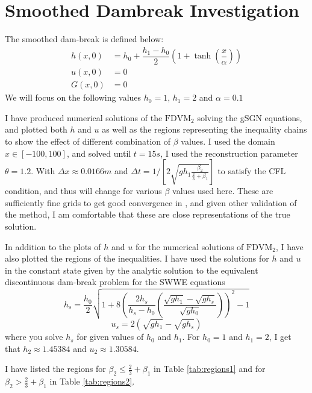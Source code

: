 \documentclass[10pt]{article}
\begin{document}
\section{Smoothed Dambreak Investigation}

The smoothed dam-break is defined below:
\begin{align}
h(x,0) & = h_0 + \dfrac{h_1 - h_0}{2} \left(1 + \tanh\left(\dfrac{x}{\alpha}\right)\right)  \\
u(x,0) &= 0 \\
G(x,0) &= 0
\end{align}
We will focus on the following values $h_0 = 1$, $h_1 = 2$ and $\alpha = 0.1$

I have produced numerical solutions of the $\text{FDVM}_2$ solving the gSGN equations, and plotted both $h$ and $u$ as well as the regions representing the inequality chains to show the effect of different combination of $\beta$ values. I used the domain $x \in [-100, 100]$, and solved until $t = 15s$, I used the reconstruction parameter $\theta = 1.2$. With $\Delta x \approx 0.0166m$ and $\Delta t =  1/ \left[{2\sqrt{gh_1 \frac{\beta_2}{\frac{2}{3} + \beta_1}}} \right]$ to satisfy the CFL condition, and thus will change for various $\beta$ values used here. These are sufficiently fine grids to get good convergence in \cite{Pitt-2019}, and given other validation of the method, I am comfortable that these are close representations of the true solution. 

In addition to the plots of $h$ and $u$ for the numerical solutions of $\text{FDVM}_2$, I have also plotted the regions of the inequalities. I have used the solutions for $h$ and $u$ in the constant state given by the analytic solution to the equivalent discontinuous dam-break problem for the SWWE equations
\begin{equation}
h_s = \dfrac{h_0}{2}  \sqrt{1 + 8 \left( \dfrac{2 h_s}{h_s - h_0} \left(\dfrac{\sqrt{gh_1} - \sqrt{gh_s}}{\sqrt{gh_0}}\right)\right)^2 - 1}
\end{equation}
\begin{equation}
u_s = 2\left(\sqrt{gh_1} - \sqrt{gh_s} \right)
\end{equation}
where you solve $h_s$ for given values of $h_0$ and $h_1$. For $h_0 = 1$ and $h_1 = 2$, I get that $h_2 \approx 1.45384$ and $u_2\approx  1.30584$.


I have listed the regions for $\beta_2 \le \frac{2}{3} + \beta_1$ in Table \ref{tab:regions1} and for $\beta_2 > \frac{2}{3} + \beta_1$  in Table \ref{tab:regions2}.
\end{document}
